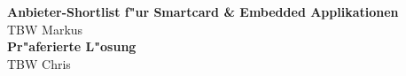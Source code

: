 \textbf{Anbieter-Shortlist f"ur Smartcard \& Embedded Applikationen}\\
TBW Markus\\

\textbf{Pr"aferierte L"osung}\\
TBW Chris\\